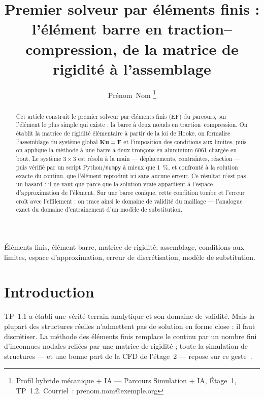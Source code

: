 \documentclass[10pt,journal]{IEEEtran}
\begin{document}
\title{Premier solveur par éléments finis : l'élément barre en traction--compression, de la matrice de rigidité à l'assemblage}

\author{Prénom~Nom%
\thanks{Profil hybride mécanique + IA --- Parcours Simulation + IA, Étage~1, TP~1.2. Courriel~: prenom.nom@exemple.org}}


\maketitle

\begin{abstract}
Cet article construit le premier solveur par éléments finis (EF) du parcours, sur l'élément le plus simple qui existe : la barre à deux n\oe{}uds en traction--compression. On établit la matrice de rigidité élémentaire à partir de la loi de Hooke, on formalise l'assemblage du système global $\mathbf{K}\mathbf{u}=\mathbf{F}$ et l'imposition des conditions aux limites, puis on applique la méthode à une barre à deux tronçons en aluminium 6061 chargée en bout. Le système $3\times 3$ est résolu à la main --- déplacements, contraintes, réaction --- puis vérifié par un script Python/\texttt{numpy} à mieux que 1~\%, et confronté à la solution exacte du continu, que l'élément reproduit ici sans aucune erreur. Ce résultat n'est pas un hasard : il ne vaut que parce que la solution vraie appartient à l'espace d'approximation de l'élément. Sur une barre conique, cette condition tombe et l'erreur croît avec l'effilement : on trace ainsi le domaine de validité du maillage --- l'analogue exact du domaine d'entraînement d'un modèle de substitution.
\end{abstract}

\begin{IEEEkeywords}
Éléments finis, élément barre, matrice de rigidité, assemblage, conditions aux limites, espace d'approximation, erreur de discrétisation, modèle de substitution.
\end{IEEEkeywords}

\IEEEpeerreviewmaketitle

\section{Introduction}
 TP~1.1 a établi une vérité-terrain analytique et son domaine de validité. Mais la plupart des structures réelles n'admettent pas de solution en forme close : il faut discrétiser. La méthode des éléments finis remplace le continu par un nombre fini d'inconnues nodales reliées par une matrice de rigidité ; toute la simulation de structures --- et une bonne part de la CFD de l'étage~2 --- repose sur ce geste~\cite{zienkiewicz}.
\end{document}
